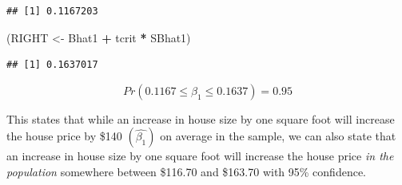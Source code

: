 \documentclass[
]{book}
\newenvironment{Shaded}{\begin{snugshade}}{\end{snugshade}}
\newcommand{\AttributeTok}[1]{\textcolor[rgb]{0.13,0.29,0.53}{#1}}
\newcommand{\CommentTok}[1]{\textcolor[rgb]{0.56,0.35,0.01}{\textit{#1}}}
\newcommand{\ConstantTok}[1]{\textcolor[rgb]{0.56,0.35,0.01}{#1}}
\newcommand{\DecValTok}[1]{\textcolor[rgb]{0.00,0.00,0.81}{#1}}
\newcommand{\FloatTok}[1]{\textcolor[rgb]{0.00,0.00,0.81}{#1}}
\newcommand{\FunctionTok}[1]{\textcolor[rgb]{0.13,0.29,0.53}{\textbf{#1}}}
\newcommand{\NormalTok}[1]{#1}
\newcommand{\OtherTok}[1]{\textcolor[rgb]{0.56,0.35,0.01}{#1}}
\newcommand{\SpecialCharTok}[1]{\textcolor[rgb]{0.81,0.36,0.00}{\textbf{#1}}}
\begin{document}
\begin{Shaded}
\end{Shaded}

\begin{verbatim}
## [1] 0.1167203
\end{verbatim}

\begin{Shaded}
\begin{Highlighting}[]
\NormalTok{(RIGHT }\OtherTok{\textless{}{-}}\NormalTok{ Bhat1 }\SpecialCharTok{+}\NormalTok{ tcrit }\SpecialCharTok{*}\NormalTok{ SBhat1)}
\end{Highlighting}
\end{Shaded}

\begin{verbatim}
## [1] 0.1637017
\end{verbatim}

\[Pr(0.1167 \leq \beta_1 \leq 0.1637)=0.95\]

This states that while an increase in house size by one square foot will increase the house price by \$140 \((\hat{\beta_1})\) on average in the sample, we can also state that an increase in house size by one square foot will increase the house price \emph{in the population} somewhere between \$116.70 and \$163.70 with 95\% confidence.
\end{document}
